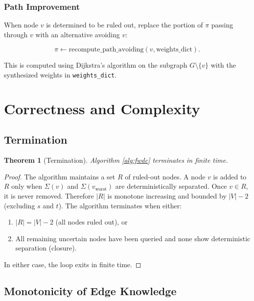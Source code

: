 \documentclass[twocolumn,11pt,a4paper]{article}
\newtheorem{theorem}{Theorem}[section]
\theoremstyle{definition}
\begin{document}
\subsubsection{Path Improvement}

When node $v$ is determined to be ruled out, replace the portion of $\pi$ passing through $v$ with an alternative avoiding $v$:

\begin{equation}
\pi \leftarrow \text{recompute\_path\_avoiding}(v, \text{weights\_dict}).
\end{equation}

This is computed using Dijkstra's algorithm on the subgraph $G \setminus \{v\}$ with the synthesized weights in \texttt{weights\_dict}.

\section{Correctness and Complexity}

\subsection{Termination}

\begin{theorem}[Termination]
\label{thm:termination}
Algorithm \ref{alg:fwdc} terminates in finite time.
\end{theorem}

\begin{proof}
The algorithm maintains a set $R$ of ruled-out nodes. A node $v$ is added to $R$ only when $\Sigma(v)$ and $\Sigma(v_{\text{worst}})$ are deterministically separated. Once $v \in R$, it is never removed. Therefore $|R|$ is monotone increasing and bounded by $|V| - 2$ (excluding $s$ and $t$). The algorithm terminates when either:
\begin{enumerate}
\item $|R| = |V| - 2$ (all nodes ruled out), or
\item All remaining uncertain nodes have been queried and none show deterministic separation (closure).
\end{enumerate}
In either case, the loop exits in finite time.
\end{proof}

\subsection{Monotonicity of Edge Knowledge}
\end{document}
